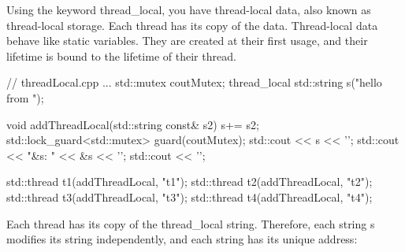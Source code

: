 
Using the keyword thread\_local, you have thread-local data, also known as thread-local storage. Each thread has its copy of the data. Thread-local data behave like static variables. They are created at their first usage, and their lifetime is bound to the lifetime of their thread.


\begin{cpp}
	// threadLocal.cpp
	...
	std::mutex coutMutex;
	thread_local std::string s("hello from ");
	
	void addThreadLocal(std::string const& s2){
		s+= s2;
		std::lock_guard<std::mutex> guard(coutMutex);
		std::cout << s << '\n';
		std::cout << "&s: " << &s << '\n';
		std::cout << '\n';
	}
	
	std::thread t1(addThreadLocal, "t1");
	std::thread t2(addThreadLocal, "t2");
	std::thread t3(addThreadLocal, "t3");
	std::thread t4(addThreadLocal, "t4");
\end{cpp}

Each thread has its copy of the thread\_local string. Therefore, each string s modifies its string independently, and each string has its unique address:













































